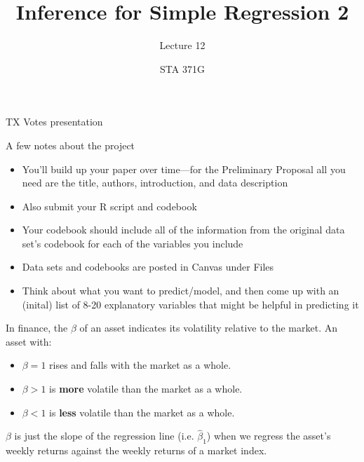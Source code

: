 \documentclass{beamer}\usepackage[]{graphicx}\usepackage[]{color}
\title{Inference for Simple Regression 2}
\subtitle{Lecture 12}
\author{STA 371G}
\begin{document}
  
  
  

  \frame{\maketitle}



  \begin{darkframes}
    \begin{frame}
      \begin{center}
        TX Votes presentation
      \end{center}
    \end{frame}
    
    \begin{frame}{A few notes about the project}
      \begin{itemize}
        \item You'll build up your paper over time---for the Preliminary Proposal all you need are the title, authors, introduction, and data description
        \item Also submit your R script and codebook
        \item Your codebook should include all of the information from the original data set's codebook for each of the variables you include
        \item Data sets and codebooks are posted in Canvas under Files
        \item Think about what you want to predict/model, and then come up with an (inital) list of 8-20 explanatory variables that might be helpful in predicting it
      \end{itemize}
    \end{frame}

    \begin{frame}
      In finance, the $\beta$ of an asset indicates its volatility relative to the market. An asset with:
      \begin{itemize}
        \item $\beta=1$ rises and falls with the market as a whole.
        \item $\beta>1$ is \textbf{more} volatile than the market as a whole.
        \item $\beta<1$ is \textbf{less} volatile than the market as a whole.
      \end{itemize}
      $\beta$ is just the slope of the regression line (i.e. $\hat\beta_1$) when we regress the asset's weekly returns against the weekly returns of a market index.
    \end{frame}


\end{darkframes}
\end{document}
